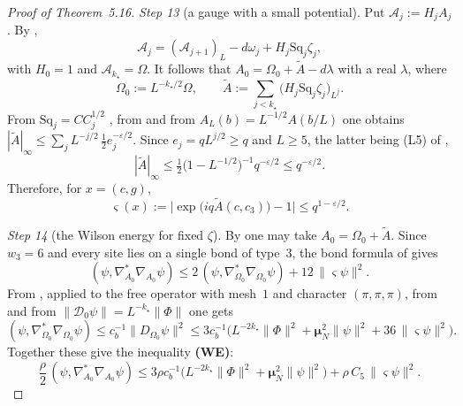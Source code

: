 \documentclass[11pt]{amsart}
\theoremstyle{definition}
\begin{document}
\begin{proof}[Proof of Theorem~5.16]
\emph{Step 13} (a gauge with a small potential).
Put $\mathscr A_j:=H_jA_j$.
By \cite[Proposition~5.52\,(iii)]{QEDI},
\begin{equation*}
\mathscr A_j=(\mathscr A_{j+1})_L-d\omega_j+H_j\mathrm{Sq}_j\zeta_j,
\end{equation*}
with $H_0=1$ and $\mathscr A_{k_\star}=\Omega$.
It follows that $A_0=\Omega_0+\tilde A-d\lambda$ with a real $\lambda$, where
\begin{equation*}
\Omega_0:=L^{-k_\star/2}\Omega,\qquad\tilde A:=\sum_{j<k_\star}\bigl(H_j\mathrm{Sq}_j\zeta_j\bigr)_{L^j}.
\end{equation*}
From $\mathrm{Sq}_j=CC_j^{1/2}$ \cite{QEDI}, from \cite[Proposition~5.38\,(iii)]{QEDI} and from $A_L(b)=L^{-1/2}A(b/L)$ one obtains $|\tilde A|_\infty\le\sum_jL^{-j/2}\,\frac12e_j^{-\varepsilon/2}$.
Since $e_j=qL^{j/2}\ge q$ and $L\ge5$, the latter being (L5) of \cite[Proposition~14.2\,(b)]{QEDIII},
\begin{equation*}
|\tilde A|_\infty\le\tfrac12\bigl(1-L^{-1/2}\bigr)^{-1}q^{-\varepsilon/2}\le q^{-\varepsilon/2}.
\end{equation*}
Therefore, for $x=(c,g)$,
\begin{equation*}
\varsigma(x):=\bigl|\exp\bigl(iq\tilde A(c,c_3)\bigr)-1\bigr|\le q^{1-\varepsilon/2}.
\end{equation*}

\emph{Step 14} (the Wilson energy for fixed $\zeta$).
By \cite[(I.O4)]{QEDIII} one may take $A_0=\Omega_0+\tilde A$.
Since $w_3=6$ and every site lies on a single bond of type~$3$, the bond formula of \cite[(I.O2)]{QEDIII} gives
\begin{equation*}
(\psi,\nabla^*_{A_0}\nabla_{A_0}\psi)\le2\,(\psi,\nabla^*_{\Omega_0}\nabla_{\Omega_0}\psi)+12\,\|\varsigma\psi\|^2 .
\end{equation*}
From \cite[Proposition~1.3\,(b)]{QEDIII}, applied to the free operator with mesh~$1$ and character $(\pi,\pi,\pi)$, from \cite[(I.O6)]{QEDIII} and from $\|\mathcal D_0\psi\|=L^{-k_\star}\|\Phi\|$ one gets
\begin{equation*}
(\psi,\nabla^*_{\Omega_0}\nabla_{\Omega_0}\psi)\le c_b^{-1}\|D_{\Omega_0}\psi\|^2\le3c_b^{-1}\bigl(L^{-2k_\star}\|\Phi\|^2+\boldsymbol\mu_N^2\|\psi\|^2+36\,\|\varsigma\psi\|^2\bigr).
\end{equation*}
Together these give the inequality \textbf{(WE)}:
\begin{equation}
\tag{WE}
\frac\rho2\,(\psi,\nabla^*_{A_0}\nabla_{A_0}\psi)\le3\rho c_b^{-1}\bigl(L^{-2k_\star}\|\Phi\|^2+\boldsymbol\mu_N^2\|\psi\|^2\bigr)+\rho\,C_5\,\|\varsigma\psi\|^2 .
\end{equation}


\end{proof}
\end{document}
